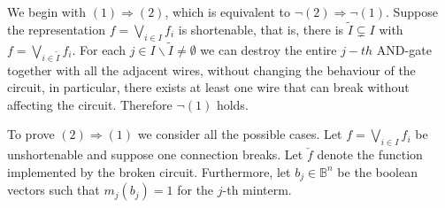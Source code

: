 \documentclass[10pt,a4paper]{scrartcl}
\begin{document}
 We begin with $(1) \Rightarrow (2)$, which is equivalent to
$\neg(2) \Rightarrow \neg(1)$. Suppose the representation $f = \bigvee_{i \in I} f_i$ is
shortenable, that is, there is $\tilde I \subsetneq I$ with 
$f = \bigvee_{i \in \tilde I} f_i$. For each $j \in I \backslash \tilde I \neq \emptyset$ we can destroy
the entire $j-th$ AND-gate together with all the adjacent wires, without changing the 
behaviour of the circuit, in particular, there exists at least one wire that can break without affecting
the circuit. Therefore $\neg (1)$ holds.

To prove $(2) \Rightarrow (1)$ we consider all the possible cases. Let $f = \bigvee_{i \in I} f_i$ be
unshortenable and suppose one connection breaks. Let $\check f$ denote the function implemented by the
broken circuit. Furthermore, let $b_j\in \mathbb{B}^n$ be the boolean vectors such that $m_j(b_j) = 1$
for the $j$-th minterm.
\end{document}
